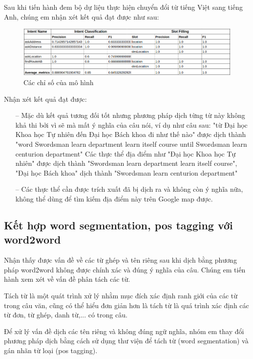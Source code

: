 Sau khi tiến hành đem bộ dự liệu thực hiện chuyển đổi từ tiếng Việt sang tiếng Anh, chúng em nhận xét kết quả đạt được như sau:

\begin{figure}[htp]
    \centering
    \includegraphics[width=15cm]{images/metrics-word2word.png}
    \caption{Các chỉ số của mô hình}
    \label{fig:metrics-word2word}
\end{figure}
Nhận xét kết quả đạt được:
\begin{itemize}
    \item[--] Mặc dù kết quả tương đối tốt nhưng phương pháp dịch từng từ này không khả thi bởi vì sẽ mà mất ý nghĩa của câu nói, ví dụ như câu sau: "từ Đại học Khoa học Tự nhiên đến Đại học Bách khoa đi như thế nào" được dịch thành "word Swordsman learn department learn itself course until Swordsman learn centurion department" Các thực thể địa điểm như "Đại học Khoa học Tự nhiên" được dịch thành "Swordsman learn department learn itself course", "Đại học Bách khoa" dịch thành "Swordsman learn centurion department"
    \item[--] Các thực thể cần được trích xuất đã bị dịch ra và không còn ý nghĩa nữa, không thể dùng để tìm kiếm địa điểm này trên Google map được.
\end{itemize}
\subsection{Kết hợp word segmentation, pos tagging với word2word}

Nhận thấy được vấn đề về các từ ghép và tên riêng sau khi dịch bằng phương pháp word2word không được chính xác và đúng ý nghĩa của câu. Chúng em tiến hành xem xét về vấn đề phân tách các từ.

Tách từ là một quát trình xử lý nhằm mục đích xác định ranh giới của các từ trong câu văn, cũng có thể hiểu đơn giản hơn là tách từ là quá trình xác định các từ đơn, từ ghép, danh từ,... có trong câu.

Để xử lý vấn đề dịch các tên riêng và không đúng ngữ nghĩa, nhóm em thay đổi phương pháp dịch bằng cách sử dụng thư viện để tách từ (word segmentation) và gán nhãn từ loại (pos tagging).

